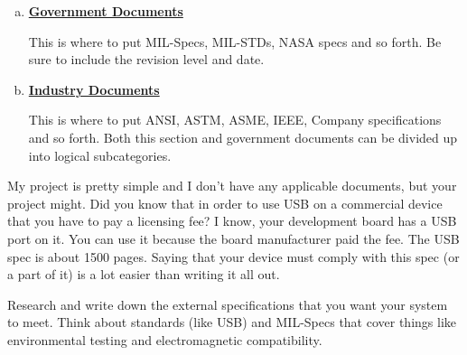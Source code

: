 \begin{enumerate}[(a)]
	\item \textbf{\underline{Government Documents}}
		\begin{slshape} \color{blue}
			This is where to put MIL-Specs, MIL-STDs, NASA specs and so forth. Be 
			sure to include the revision level and date.
		\end{slshape}
	\item \textbf{\underline{Industry Documents}}	
		\begin{slshape} \color{blue}
			This is where to put ANSI, ASTM, ASME, IEEE, Company specifications and 
			so forth. Both this section and government documents can be divided up 
			into logical subcategories.
		\end{slshape}
\end{enumerate}

\begin{slshape}
\color{blue}

My project is pretty simple and I don't have any applicable documents, but your project might.  Did you know that in order to use USB on a commercial device that you have to pay a licensing fee?  I know, your development board has a USB port on it.  You can use it because the board manufacturer paid the fee. The USB spec is about 1500 pages.  Saying that your device must comply with this spec (or a part of it) is a lot easier than writing it all out.
\bigskip

\StopSign Research and write down the external specifications that you want your system to meet.  Think about standards (like USB) and MIL-Specs that cover things like environmental testing and electromagnetic compatibility.
\bigskip

\end{slshape}